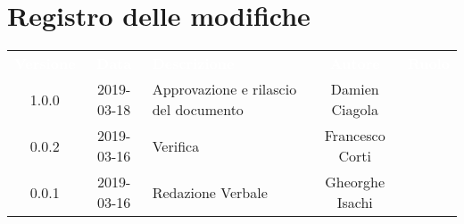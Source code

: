 \section*{Registro delle modifiche}
{
	\renewcommand{\arraystretch}{1.5}
	\centering
	\begin{longtable}{ c c  C{4cm}  c  c }
		
		\textcolor{white}{\textbf{Versione}} & \textcolor{white}{\textbf{Data}} & \textcolor{white}{\textbf{Descrizione}} & \textcolor{white}{\textbf{Autore}} & \textcolor{white}{\textbf{Ruolo}}\\
		
		1.0.0 & 2019-03-18 & Approvazione e rilascio del documento & Damien Ciagola & \Res{}\\
		
		0.0.2 & 2019-03-16 & Verifica & Francesco Corti & \ver{} \\
	
		0.0.1 & 2019-03-16 & Redazione Verbale & Gheorghe Isachi & \reda{}\\
		
	\end{longtable}

}